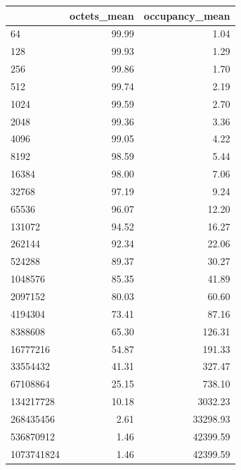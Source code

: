 \begin{tabular}{lrr}
\toprule
 & octets_mean & occupancy_mean \\
\midrule
64 & 99.99 & 1.04 \\
128 & 99.93 & 1.29 \\
256 & 99.86 & 1.70 \\
512 & 99.74 & 2.19 \\
1024 & 99.59 & 2.70 \\
2048 & 99.36 & 3.36 \\
4096 & 99.05 & 4.22 \\
8192 & 98.59 & 5.44 \\
16384 & 98.00 & 7.06 \\
32768 & 97.19 & 9.24 \\
65536 & 96.07 & 12.20 \\
131072 & 94.52 & 16.27 \\
262144 & 92.34 & 22.06 \\
524288 & 89.37 & 30.27 \\
1048576 & 85.35 & 41.89 \\
2097152 & 80.03 & 60.60 \\
4194304 & 73.41 & 87.16 \\
8388608 & 65.30 & 126.31 \\
16777216 & 54.87 & 191.33 \\
33554432 & 41.31 & 327.47 \\
67108864 & 25.15 & 738.10 \\
134217728 & 10.18 & 3032.23 \\
268435456 & 2.61 & 33298.93 \\
536870912 & 1.46 & 42399.59 \\
1073741824 & 1.46 & 42399.59 \\
\bottomrule
\end{tabular}
